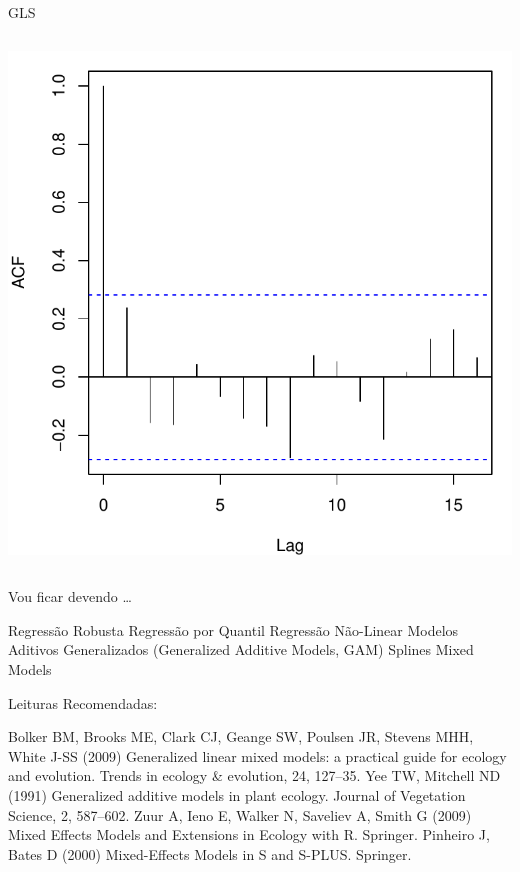 \documentclass{beamer}\usepackage[]{graphicx}\usepackage[]{color}
\newenvironment{knitrout}{}{} %
\renewenvironment{knitrout}{\setlength{\topsep}{0mm}}{}
\begin{document}
\begin{frame}[fragile]{GLS}
\begin{columns}[c]
\begin{knitrout}
\includegraphics[width=0.7\linewidth]{figure/glspt3-2} 

\end{knitrout}

\end{columns}

\end{frame}


\begin{frame}{Vou ficar devendo \ldots}

Regressão Robusta
\vfill
Regressão por Quantil
\vfill
Regressão Não-Linear
\vfill
Modelos Aditivos Generalizados (Generalized Additive Models, GAM)
\vfill
Splines
\vfill 
Mixed Models


\end{frame}



\begin{frame}{Leituras Recomendadas:}

\begin{scriptsize}

Bolker BM, Brooks ME, Clark CJ, Geange SW, Poulsen JR, Stevens MHH, White J-SS (2009) Generalized linear mixed models: a practical guide for ecology and evolution. Trends in ecology & evolution, 24, 127–35.
\vfill
Yee TW, Mitchell ND (1991) Generalized additive models in plant ecology. Journal of Vegetation Science, 2, 587–602.
\vfill
Zuur A, Ieno E, Walker N, Saveliev A, Smith G (2009) Mixed Effects Models and Extensions in Ecology with R. Springer.
\vfill
Pinheiro J, Bates D (2000) Mixed-Effects Models in S and S-PLUS. Springer.

\end{scriptsize}

\end{frame}
\end{document}

